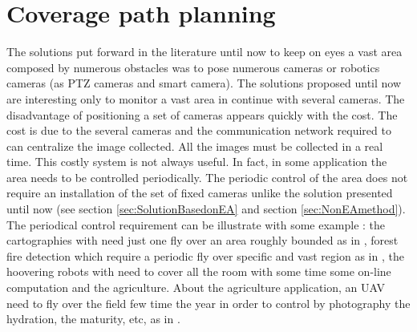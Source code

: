  
%
%
% 


\section{Coverage path planning}\label{sec:CppLiterattur}

The solutions put forward in the literature until now to keep on eyes a vast area composed by numerous obstacles was to pose numerous cameras or robotics cameras (as PTZ cameras and smart camera).
The solutions proposed until now are interesting only to monitor a vast area  in continue with several cameras. 
The disadvantage of positioning a set of cameras appears quickly with the cost. The cost is due to the several cameras and the communication network required to can centralize the image collected. All the images must be collected in a real time. This costly system is not always useful. 
In fact, in some application the area needs to be controlled periodically. The periodic control of the area does not require an installation of the set of fixed cameras unlike the solution presented until now (see section \ref{sec:SolutionBasedonEA} and section \ref{sec:NonEAmethod}). The periodical control requirement can be illustrate with some example :  the cartographies with need just one fly over an area roughly bounded as in \citep{66*galceran2013,164*valente2013}, forest fire detection which require a periodic fly over specific and vast region as in \cite{237*casbeer2006}, the hoovering robots with need to cover all the room with some time some on-line computation \citep{218*meiting2007,216*luo2002,215*lee2010,196*yang2004}  and the agriculture.
 About the agriculture application, an UAV need to fly over the field few time the year in order to control by photography the hydration, the maturity, etc, as in \citep{164*valente2013,203*zarco2008,63*chao2008,105*long199,167*barrientos2011,177*lelong2008}. %

